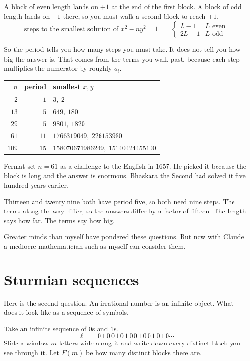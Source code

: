 \documentclass[11pt,a4paper]{article}
\theoremstyle{definition}
\theoremstyle{plain}
\begin{document}
A block of even length lands on $+1$ at the end of the first block. A block of
odd length lands on $-1$ there, so you must walk a second block to reach $+1$.
\[
  \text{steps to the smallest solution of } x^2 - ny^2 = 1
  \;=\;
  \begin{cases}
    L - 1  & L \text{ even} \\
    2L - 1 & L \text{ odd}
  \end{cases}
\]

So the period tells you how many steps you must take. It does not tell you how
big the answer is. That comes from the terms you walk past, because each step
multiplies the numerator by roughly $a_i$.

\begin{center}
\begin{tabular}{rrl}
\toprule
$n$ & period & smallest $x, y$ \\
\midrule
$2$   & $1$  & $3,\ 2$ \\
$13$  & $5$  & $649,\ 180$ \\
$29$  & $5$  & $9801,\ 1820$ \\
$61$  & $11$ & $1766319049,\ 226153980$ \\
$109$ & $15$ & $158070671986249,\ 15140424455100$ \\
\bottomrule
\end{tabular}
\end{center}

Fermat set $n = 61$ as a challenge to the English in 1657. He picked it because
the block is long and the answer is enormous. Bhaskara the Second had solved it
five hundred years earlier.

Thirteen and twenty nine both have period five, so both need nine steps. The
terms along the way differ, so the answers differ by a factor of fifteen. The
length says how far. The terms say how big.

Greater minds than myself have pondered these questions. But now with Claude a
mediocre mathematician such as myself can consider them.

\section{Sturmian sequences}

Here is the second question. An irrational number is an infinite object. What
does it look like as a sequence of symbols.

Take an infinite sequence of $0$s and $1$s.
\[
  \ell \;=\; 0\,1\,0\,0\,1\,0\,1\,0\,0\,1\,0\,0\,1\,0\,1\,0 \cdots
\]
Slide a window $m$ letters wide along it and write down every distinct block you
see through it. Let $F(m)$ be how many distinct blocks there are.
\end{document}
